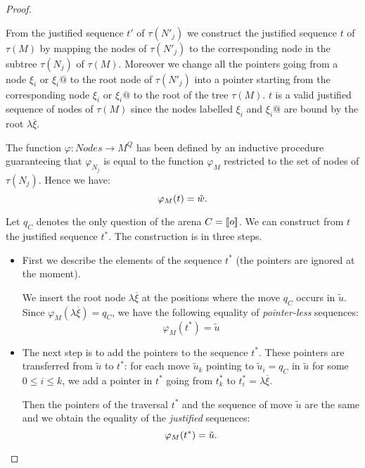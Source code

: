\begin{proof}
\begin{itemize}
    From the justified sequence $t'$ of $\tau(N'_j)$ we construct the justified sequence $t$ of
    $\tau(M)$ by mapping the nodes of $\tau(N'_j)$ to the corresponding node in the subtree $\tau(N_j)$
    of $\tau(M)$. Moreover we change all the pointers going from a node $\xi_i$ or $\xi_i @$ to the root node of $\tau(N'_j)$
    into a pointer starting from the corresponding node $\xi_i$ or $\xi_i @$ to the root of the tree $\tau(M)$.
    $t$ is a valid justified sequence of nodes of $\tau(M)$ since the nodes labelled $\xi_i$ and $\xi_i @$
    are bound by the root $\lambda \overline{\xi}$.

    The function $\varphi : Nodes \rightarrow M^Q$ has been defined by an inductive procedure
    guaranteeing that $\varphi_{N_j}$ is equal to the function $\varphi_{M}$ restricted to
    the set of nodes of $\tau(N_j)$. Hence we have:
    \begin{equation}
    \varphi_{M}(t) = \tilde{w}. \label{eq:def_t}
    \end{equation}

    Let $q_C$ denotes the only question of the arena $C = {[\![ o ]\!]}$.
    We can construct from $t$ the justified sequence $t^\ast$. The construction is in three steps.
    \begin{itemize}
    \item First we describe the elements of the sequence $t^\ast$ (the pointers are ignored at the moment).

    We insert the root node $\lambda \overline{\xi}$ at the positions where the move $q_C$ occurs in $\tilde{u}$.
    Since $\varphi_{M}(\lambda \overline{\xi}) = q_C$, we have the following equality of \emph{pointer-less} sequences:
    $$\varphi_{M}(t^\ast) = \tilde{u}$$

    \item The next step is to add the pointers to the sequence $t^\ast$.
    These pointers are transferred from $\tilde{u}$ to $t^\ast$: for each
    move $\tilde{u}_k$ pointing to $\tilde{u}_i = q_C$ in $\tilde{u}$ for some $0 \leq i \leq k$,
    we add a pointer in $t^\ast$ going from $t^\ast_k$ to $t^\ast_i = \lambda \overline{\xi}$.

    Then the pointers of the traversal $t^\ast$ and the sequence of move $\tilde{u}$ are the same and we obtain the equality of the
    \emph{justified} sequences:
    \begin{equation}
    \varphi_{M}(t^\ast) = \tilde{u}. \label{eq:def_tstar}
    \end{equation}


\end{itemize}
\end{itemize}
\end{proof}
